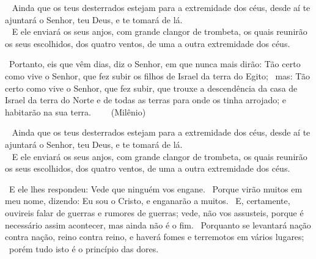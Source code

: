 \documentclass[12pt,aspectratio=169]{beamer}
\newcommand{\ver}[1]{%
    \raisebox{0.50ex}{%
        \scalebox{1.1}{%
            \pmb{\textbf{\textcolor{BSpbg}{#1}}}%
        }%
    }%
}
\newcommand{\QUOTE}[1]{%
    \par\noindent\hspace*{0.1\linewidth}%
    \begin{minipage}{0.8\linewidth}%
        \linespread{1.35}\large{#1}%
    \end{minipage}%
}
\newcommand{\WIDEQUOTE}[1]{%
    \par\noindent\hspace*{0.02\linewidth}%
    \begin{minipage}{0.92\linewidth}%
        \linespread{1.25}\large{#1}%
    \end{minipage}%
}
\newcommand{\RED}[1]{{\textcolor{TXred}{#1}}}
\newcommand{\ORA}[1]{{\textcolor{TXora}{#1}}}
\newcommand{\YEL}[1]{{\textcolor{TXyel}{#1}}}
\newcommand{\GRE}[1]{{\textcolor{TXgre}{#1}}}
\newcommand{\CYA}[1]{{\textcolor{TXcya}{#1}}}
\newcommand{\BLU}[1]{{\textcolor{TXblu}{#1}}}
\newcommand{\MAG}[1]{{\textcolor{TXmag}{#1}}}
\newcommand{\BRI}[1]{{\textcolor{BSpbg}{#1}}}   %
\begin{document}
    \begin{frame}
        \QUOTE{%
            \ver{(ARA) Dt~30.4}~%
            Ainda  que  os   teus   \BLU{des}\BRI{ter}\BLU{ra}\BRI{dos}   estejam   para   a
            \GRE{extremidade dos céus}, desde aí te \ORA{ajuntará} o Senhor, teu Deus, e  te
            tomará de lá. \\[\bigskipamount]
            \ver{(ARA) Mt~24.31}~%
            E ele enviará os seus \YEL{anjos}, com grande  clangor  de  trombeta,  os  quais
            \ORA{reunirão} os seus \BLU{es}\BRI{co}\BLU{lhi}\BRI{dos},  dos  quatro  ventos,
            de uma a outra \GRE{extremidade dos céus}.
        }
    \end{frame}

    \begin{frame}
        \QUOTE{%
            \ver{(ARA) Jr~23.7}~Portanto, eis que vêm dias, diz o Senhor, em que nunca  mais
            dirão: Tão certo como vive o Senhor, que fez \YEL{subir os filhos de  Israel  da
            terra do Egito}; \ver{8}~mas: Tão certo como vive o Senhor, que fez  subir,  que
            \MAG{trouxe a descendência da casa de Israel da terra do Norte  e  de  todas  as
            terras  para  onde  os  tinha  arrojado};  \GRE{e  habitarão  na   sua   terra}.
            $\qquad$(\GRE{Milênio})
        }
    \end{frame}

    \begin{frame}
        \QUOTE{%
            \ver{(ARA) Dt~30.4}~%
            Ainda  que  os   teus   \BLU{des}\BRI{ter}\BLU{ra}\BRI{dos}   estejam   para   a
            \GRE{extremidade dos céus}, desde aí te \ORA{ajuntará} o Senhor, teu Deus, e  te
            tomará de lá. \\[\bigskipamount]
            \ver{(ARA) Mt~24.31}~%
            E ele enviará os seus \YEL{anjos}, com grande  clangor  de  trombeta,  os  quais
            \ORA{reunirão} os seus \BLU{es}\BRI{co}\BLU{lhi}\BRI{dos},  dos  quatro  ventos,
            de uma a outra \GRE{extremidade dos céus}.
        }
    \end{frame}

    \begin{frame}
        \WIDEQUOTE{%
            \ver{(ARA) Mt~24.4}~E ele lhes respondeu: Vede  que  ninguém  vos  \RED{engane}.
            \ver{5}~Porque  virão  muitos  em  meu  nome,  dizendo:  Eu  sou  o  Cristo,   e
            \RED{enganarão} a muitos. \ver{6}~E, certamente, ouvireis falar de \ORA{guerras}
            e \ORA{rumores de guerras}; vede, não vos assusteis, porque é  necessário  assim
            acontecer, mas ainda não é o \BLU{fim}.  \ver{7}~Porquanto  se  levantará  nação
            \ORA{contra}  nação,  reino  \ORA{contra}  reino,   e   haverá   \YEL{fomes}   e
            \GRE{terremotos} em \YEL{vários} \GRE{lugares};  \ver{8}~porém  tudo  isto  é  o
            \CYA{princípio das dores}.
        }
    \end{frame}
\end{document}
